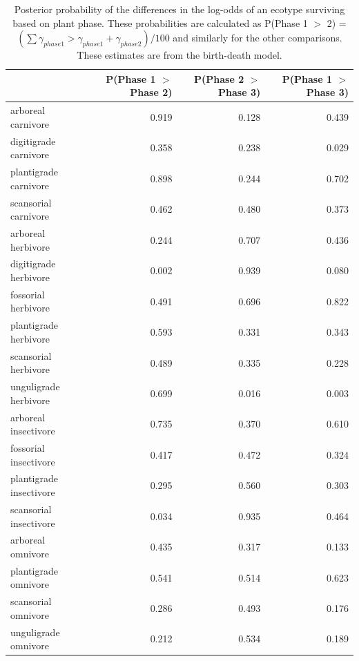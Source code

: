 \documentclass[12pt,letterpaper]{article}
\begin{document}
\begin{table}[ht]
  \centering
  \caption[Posterior probablity estimates of differences in survival by plant phase]{Posterior probability of the differences in the log-odds of an ecotype surviving based on plant phase. These probabilities are calculated as P(Phase 1 \(>\) 2) = \( (\sum \gamma_{phase 1} > \gamma_{phase 1} + \gamma_{phase 2}) / 100\) and similarly for the other comparisons. These estimates are from the birth-death model.}
  \label{tab:surv_plant}
  \begin{tabular}{ l r r r }
    \hline
    & P(Phase 1 $>$ Phase 2) & P(Phase 2 $>$ Phase 3) & P(Phase 1 $>$ Phase 3) \\ 
    \hline
    arboreal carnivore & 0.919 & 0.128 & 0.439 \\ 
    digitigrade carnivore & 0.358 & 0.238 & 0.029 \\ 
    plantigrade carnivore & 0.898 & 0.244 & 0.702 \\ 
    scansorial carnivore & 0.462 & 0.480 & 0.373 \\ 
    arboreal herbivore & 0.244 & 0.707 & 0.436 \\ 
    digitigrade herbivore & 0.002 & 0.939 & 0.080 \\ 
    fossorial herbivore & 0.491 & 0.696 & 0.822 \\ 
    plantigrade herbivore & 0.593 & 0.331 & 0.343 \\ 
    scansorial herbivore & 0.489 & 0.335 & 0.228 \\ 
    unguligrade herbivore & 0.699 & 0.016 & 0.003 \\ 
    arboreal insectivore & 0.735 & 0.370 & 0.610 \\ 
    fossorial insectivore & 0.417 & 0.472 & 0.324 \\ 
    plantigrade insectivore & 0.295 & 0.560 & 0.303 \\ 
    scansorial insectivore & 0.034 & 0.935 & 0.464 \\ 
    arboreal omnivore & 0.435 & 0.317 & 0.133 \\ 
    plantigrade omnivore & 0.541 & 0.514 & 0.623 \\ 
    scansorial omnivore & 0.286 & 0.493 & 0.176 \\ 
    unguligrade omnivore & 0.212 & 0.534 & 0.189 \\ 
    \hline
  \end{tabular}
\end{table}
\end{document}
